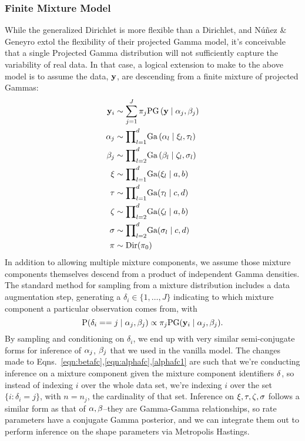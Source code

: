\subsubsection{Finite Mixture Model}
While the generalized Dirichlet is more flexible than a Dirichlet, and N{\'u}{\~n}ez \& Geneyro\cite{nunez2019}
  extol the flexibility of their projected Gamma model, it's conceivable that a single Projected Gamma
  distribution will not sufficiently capture the variability of real data.  In that case, a logical
  extension to make to the above model is to assume the data, ${\bf y}$, are descending from a finite
  mixture of projected Gammas:
  \begin{equation}
    \label{eqn:fmixp}
    \begin{aligned}
      {\bf y}_i &\sim \sum_{j = 1}^J\pi_j\text{PG}\left({\bf y}\mid {\bf \alpha}_j, {\bf \beta}_j\right)\\
      {\bf \alpha}_j &\sim {\small \prod}_{l = 1}^d \text{Ga}\left(\alpha_l\mid\xi_l,\tau_l\right)\\
      {\bf \beta}_j &\sim {\small \prod}_{l = 2}^d \text{Ga}\left(\beta_l\mid\zeta_l,\sigma_l\right)\\
      {\bf \xi} &\sim {\small \prod}_{l = 1}^d \text{Ga}(\xi_l\mid a,b)\\
      {\bf \tau} &\sim {\small \prod}_{l = 1}^d \text{Ga}(\tau_l\mid c,d)\\
      {\bf \zeta} &\sim {\small\prod}_{l = 2}^d\text{Ga}(\zeta_l \mid a,b)\\
      {\bf \sigma} &\sim {\small\prod}_{l = 2}^d\text{Ga}(\sigma_l\mid c,d)\\
      {\bf \pi} &\sim \text{Dir}(\pi_0)
    \end{aligned}
  \end{equation}
  In addition to allowing multiple mixture components, we assume those mixture components themselves
  descend from a product of independent Gamma densities. The standard method for sampling from a
  mixture distribution includes a data augmentation step, generating a
  $\delta_i \in \lbrace 1,\ldots, J\rbrace$ indicating to which mixture component a
  particular observation comes from, with
  \begin{equation*}
    \text{P}(\delta_i == j\mid\alpha_j,\beta_j) \propto \pi_j\text{PG}({\bf y}_i\mid {\bf \alpha}_j,{\bf \beta}_j).
  \end{equation*}
  By sampling and conditioning on $\delta_i$, we end up with very similar semi-conjugate forms for
  inference of ${\bf \alpha}_j$, ${\bf \beta}_j$ that we used in the vanilla model.  The changes made
  to Eqns.~\ref{eqn:betafc},\ref{eqn:alphafc},\ref{alphafc1} are such that we're conducting inference
  on a mixture component given the mixture component identifiers ${\bf \delta}$, so instead of indexing
  $i$ over the whole data set, we're indexing $i$ over the set $\{i :\delta_i = j\}$, with $n = n_j$,
  the cardinality of that set. Inference on ${\bf \xi,\tau,\zeta,\sigma}$ follows a similar form as
  that of ${\bf \alpha,\beta}$--they are Gamma-Gamma relationships, so rate parameters have a conjugate
  Gamma posterior, and we can integrate them out to perform inference on the shape parameters via
  Metropolis Hastings.

